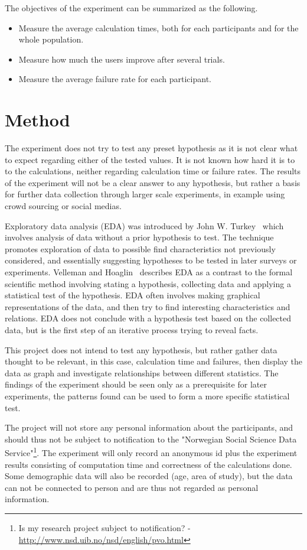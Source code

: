 \par The objectives of the experiment can be summarized as the following.
\begin{itemize}
    \item Measure the average calculation times, both for each participants and for the whole population.
    \item Measure how much the users improve after several trials.
    \item Measure the average failure rate for each participant.
\end{itemize}


\section{Method}
The experiment does not try to test any preset hypothesis as it is not clear what to expect regarding either of the tested values. It is not known how hard it is to to the calculations, neither regarding calculation time or failure rates. The results of the experiment will not be a clear answer to any hypothesis, but rather a basis for further data collection through larger scale experiments, in example using crowd sourcing or social medias.

\par Exploratory data analysis (EDA) was introduced by John W. Turkey~\cite{turkey} which involves analysis of data without a prior hypothesis to test. The technique promotes exploration of data to possible find characteristics not previously considered, and essentially suggesting hypotheses to be tested in later surveys or experiments. Velleman and Hoaglin~\cite{exploratory-analysis} describes EDA as a contrast to the formal scientific method involving stating a hypothesis, collecting data and applying a statistical test of the hypothesis. EDA often involves making graphical representations of the data, and then try to find interesting characteristics and relations. EDA does not conclude with a hypothesis test based on the collected data, but is the first step of an iterative process trying to reveal facts. 
\par This project does not intend to test any hypothesis, but rather gather data thought to be relevant, in this case, calculation time and failures, then display the data as graph and investigate relationships between different statistics. The findings of the experiment should be seen only as a prerequisite for later experiments, the patterns found can be used to form a more specific statistical test.
\begin{remark}
 The project will not store any personal information about the participants, and should thus not be subject to notification to the "Norwegian Social Science Data Service"\footnote{Is my research project subject to notification? - \url{http://www.nsd.uib.no/nsd/english/pvo.html}}. The experiment will only record an anonymous id plus the experiment results consisting of computation time and correctness of the calculations done. Some demographic data will also be recorded (age, area of study), but the data can not be connected to person and are thus not regarded as personal information.
 \end{remark}


